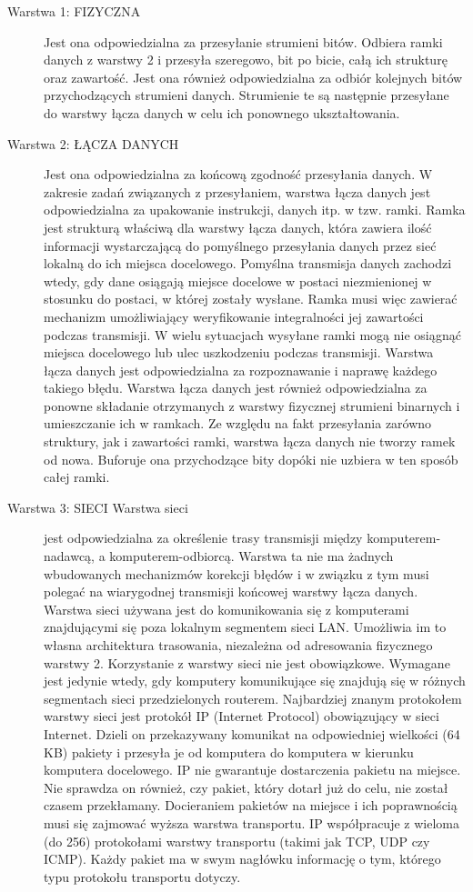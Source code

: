 \documentclass[a4paper,11pt]{article}
\begin{document}
\begin{description}
\item[Warstwa 1: FIZYCZNA] Jest ona odpowiedzialna za przesyłanie strumieni bitów. Odbiera ramki danych z warstwy 2 i przesyła szeregowo, bit po bicie, całą ich strukturę oraz zawartość. Jest ona również odpowiedzialna za odbiór kolejnych bitów przychodzących strumieni danych. Strumienie te są następnie przesyłane do warstwy łącza danych w celu ich ponownego ukształtowania.

\item[Warstwa 2: ŁĄCZA DANYCH] Jest ona odpowiedzialna za końcową zgodność przesyłania danych. W zakresie zadań związanych z przesyłaniem, warstwa łącza danych jest odpowiedzialna za upakowanie instrukcji, danych itp. w tzw. ramki. Ramka jest strukturą właściwą dla warstwy łącza danych, która zawiera ilość informacji wystarczającą do pomyślnego przesyłania danych przez sieć lokalną do ich miejsca docelowego. Pomyślna transmisja danych zachodzi wtedy, gdy dane osiągają miejsce docelowe w postaci niezmienionej w stosunku do postaci, w której zostały wysłane. Ramka musi więc zawierać mechanizm umożliwiający weryfikowanie integralności jej zawartości podczas transmisji. W wielu sytuacjach wysyłane ramki mogą nie osiągnąć miejsca docelowego lub ulec uszkodzeniu podczas transmisji. Warstwa łącza danych jest odpowiedzialna za rozpoznawanie i naprawę każdego takiego błędu. Warstwa łącza danych jest również odpowiedzialna za ponowne składanie otrzymanych z warstwy fizycznej strumieni binarnych i umieszczanie ich w ramkach. Ze względu na fakt przesyłania zarówno struktury, jak i zawartości ramki, warstwa łącza danych nie tworzy ramek od nowa. Buforuje ona przychodzące bity dopóki nie uzbiera w ten sposób całej ramki.

\item[Warstwa 3: SIECI Warstwa sieci] jest odpowiedzialna za określenie trasy transmisji między komputerem-nadawcą, a komputerem-odbiorcą. Warstwa ta nie ma żadnych wbudowanych mechanizmów korekcji błędów i w związku z tym musi polegać na wiarygodnej transmisji końcowej warstwy łącza danych. Warstwa sieci używana jest do komunikowania się z komputerami znajdującymi się poza lokalnym segmentem sieci LAN. Umożliwia im to własna architektura trasowania, niezależna od adresowania fizycznego warstwy 2. Korzystanie z warstwy sieci nie jest obowiązkowe. Wymagane jest jedynie wtedy, gdy komputery komunikujące się znajdują się w różnych segmentach sieci przedzielonych routerem. Najbardziej znanym protokołem warstwy sieci jest protokół IP (Internet Protocol) obowiązujący w sieci Internet. Dzieli on przekazywany komunikat na odpowiedniej wielkości (64 KB) pakiety i przesyła je od komputera do komputera w kierunku komputera docelowego. IP nie gwarantuje dostarczenia pakietu na miejsce. Nie sprawdza on również, czy pakiet, który dotarł już do celu, nie został czasem przekłamany. Docieraniem pakietów na miejsce i ich poprawnością musi się zajmować wyższa warstwa transportu. IP współpracuje z wieloma (do 256) protokołami warstwy transportu (takimi jak TCP, UDP czy ICMP). Każdy pakiet ma w swym nagłówku informację o tym, którego typu protokołu transportu dotyczy.


\end{description}
\end{document}
